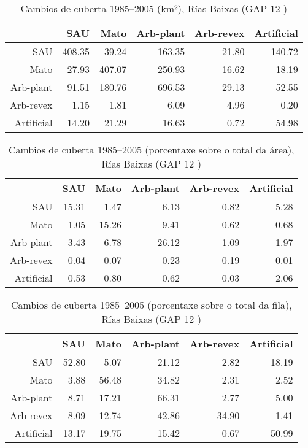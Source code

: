 \clearpage
\begin{table}[p]
\centering
\caption{Cambios de cuberta 1985--2005 (km²), Rías Baixas (GAP 12 )} 
\label{TaboaContinxGAP12}
\begin{tabular}{rrrrrr}
  \hline
 & SAU & Mato & Arb-plant & Arb-revex & Artificial \\ 
  \hline
SAU & 408.35 & 39.24 & 163.35 & 21.80 & 140.72 \\ 
  Mato & 27.93 & 407.07 & 250.93 & 16.62 & 18.19 \\ 
  Arb-plant & 91.51 & 180.76 & 696.53 & 29.13 & 52.55 \\ 
  Arb-revex & 1.15 & 1.81 & 6.09 & 4.96 & 0.20 \\ 
  Artificial & 14.20 & 21.29 & 16.63 & 0.72 & 54.98 \\ 
   \hline
\end{tabular}
\end{table}
\begin{table}[p]
\centering
\caption{Cambios de cuberta 1985--2005 (porcentaxe sobre o total da área), Rías Baixas (GAP 12 )} 
\label{TaboaContinxPTGAP12}
\begin{tabular}{rrrrrr}
  \hline
 & SAU & Mato & Arb-plant & Arb-revex & Artificial \\ 
  \hline
SAU & 15.31 & 1.47 & 6.13 & 0.82 & 5.28 \\ 
  Mato & 1.05 & 15.26 & 9.41 & 0.62 & 0.68 \\ 
  Arb-plant & 3.43 & 6.78 & 26.12 & 1.09 & 1.97 \\ 
  Arb-revex & 0.04 & 0.07 & 0.23 & 0.19 & 0.01 \\ 
  Artificial & 0.53 & 0.80 & 0.62 & 0.03 & 2.06 \\ 
   \hline
\end{tabular}
\end{table}
\begin{table}[p]
\centering
\caption{Cambios de cuberta 1985--2005 (porcentaxe sobre o total da fila), Rías Baixas (GAP 12 )} 
\label{TaboaContinxPFGAP12}
\begin{tabular}{rrrrrr}
  \hline
 & SAU & Mato & Arb-plant & Arb-revex & Artificial \\ 
  \hline
SAU & 52.80 & 5.07 & 21.12 & 2.82 & 18.19 \\ 
  Mato & 3.88 & 56.48 & 34.82 & 2.31 & 2.52 \\ 
  Arb-plant & 8.71 & 17.21 & 66.31 & 2.77 & 5.00 \\ 
  Arb-revex & 8.09 & 12.74 & 42.86 & 34.90 & 1.41 \\ 
  Artificial & 13.17 & 19.75 & 15.42 & 0.67 & 50.99 \\ 
   \hline
\end{tabular}
\end{table}
\clearpage
